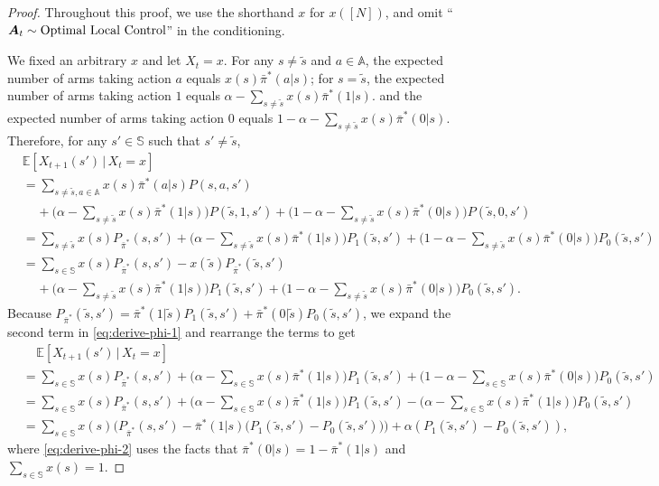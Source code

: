 \documentclass[11pt,letterpaper]{article}
\theoremstyle{plain}
\theoremstyle{definition}
\theoremstyle{remark}
\newcommand{\E}[1]{\mathbb{E}\left[#1\right]}
\newcommand{\givenplain}{\,|\,}
\newcommand{\ve}[1]{\bm{#1}}
\newcommand{\veA}{\ve{A}}
\newcommand{\sspa}{\mathbb{S}}
\newcommand{\aspa}{\mathbb{A}}
\newcommand{\sums}{\sum_{s\in\sspa}}
\newcommand{\pibar}{{\sysbar{\pi}}}
\newcommand{\pibs}{{\pibar^*}}
\newcommand{\lppriority}{\textup{Optimal Local Control}}
\newcommand{\sysbar}[1]{\bar{#1}}
\newcommand{\sneu}{\tilde{s}}
\begin{document}
\begin{proof}%
Throughout this proof, we use the shorthand $x$ for $x([N])$, and omit ``$\veA_t\sim \lppriority$'' in the conditioning. 

We fixed an arbitrary $x$ and let $X_t = x$.  
For any $s\neq \sneu$ and $a\in\aspa$, the expected number of arms taking action $a$ equals $x(s) \pibs(a|s)$; for $s=\sneu$, the expected number of arms taking action $1$ equals $\alpha -\sum_{s\neq\sneu }x(s)\pibs(1|s)$. and the expected number of arms taking action $0$ equals $1-\alpha- \sum_{s\neq\sneu }x(s)\pibs(0|s)$. 
Therefore, 
for any $s'\in\sspa$ such that $s'\neq \sneu$, 
\begin{align}
    &\E{X_{t+1}(s') \givenplain X_t=x} \nonumber \\
    \nonumber
    &= \sum_{s\neq \sneu, a\in\aspa} x(s) \pibs(a|s) P(s,a,s') \\ 
    \nonumber
    &\mspace{20mu} + \Big(\alpha - \sum_{s\neq \sneu} x(s)\pibs(1|s)\Big) P(\sneu, 1, s') 
    \nonumber
    + \Big(1 - \alpha - \sum_{s\neq \sneu} x(s) \pibs(0|s) \Big) P(\sneu, 0, s')  \\
    \nonumber
    &= \sum_{s\neq \sneu} x(s)P_\pibs(s, s')
    + \Big(\alpha - \sum_{s\neq \sneu} x(s) \pibs(1|s)\Big)P_1(\sneu, s') 
    + \Big(1 - \alpha - \sum_{s\neq \sneu} x(s)\pibs(0|s) \Big)P_0(\sneu, s') \\
    \label{eq:derive-phi-1}
    &= \sums x(s)P_\pibs(s,s')  - x(\sneu)P_\pibs(\sneu, s')  \\
    \nonumber
    &\mspace{20mu} + \Big(\alpha - \sum_{s\neq \sneu} x(s) \pibs(1|s)\Big)P_1(\sneu, s') 
    + \Big(1 - \alpha - \sum_{s\neq \sneu} x(s)\pibs(0|s) \Big)P_0(\sneu, s'). 
\end{align}
Because $P_\pibs(\sneu,s') =  \pibs(1|\sneu) P_1(\sneu,s')+ \pibs(0|\sneu)P_0(\sneu, s')$, we expand the second term in \eqref{eq:derive-phi-1} and rearrange the terms to get
\begin{align}
    &\mspace{20mu} \E{X_{t+1}(s') \givenplain X_t=x} \nonumber\\
    &=  \sums x(s)P_\pibs(s,s')
    +  \Big(\alpha - \sums x(s) \pibs(1|s) \Big) P_1(\sneu, s')
    + \Big(1 - \alpha - \sums x(s) \pibs(0|s) \Big) P_0(\sneu, s')\nonumber \\
    &= \sums x(s) P_\pibs(s,s') 
    + \Big(\alpha - \sums x(s)\pibs(1|s) \Big) P_1(\sneu, s')
    -\Big(  \alpha - \sums x(s)\pibs(1|s) \Big) P_0(\sneu, s') \label{eq:derive-phi-2}\\
    &= \sums x(s)\Big(P_\pibs(s,s') -  \pibs(1|s)\big(P_1(\sneu, s') - P_0(\sneu, s')\big) \Big) + \alpha (P_1(\sneu, s') - P_0(\sneu, s')),  \label{eq:derive-phi-3}
\end{align}
where \eqref{eq:derive-phi-2} uses the facts that $\pibs(0|s) = 1-\pibs(1|s)$ and $\sums x(s) = 1$. 


\end{proof}
\end{document}
